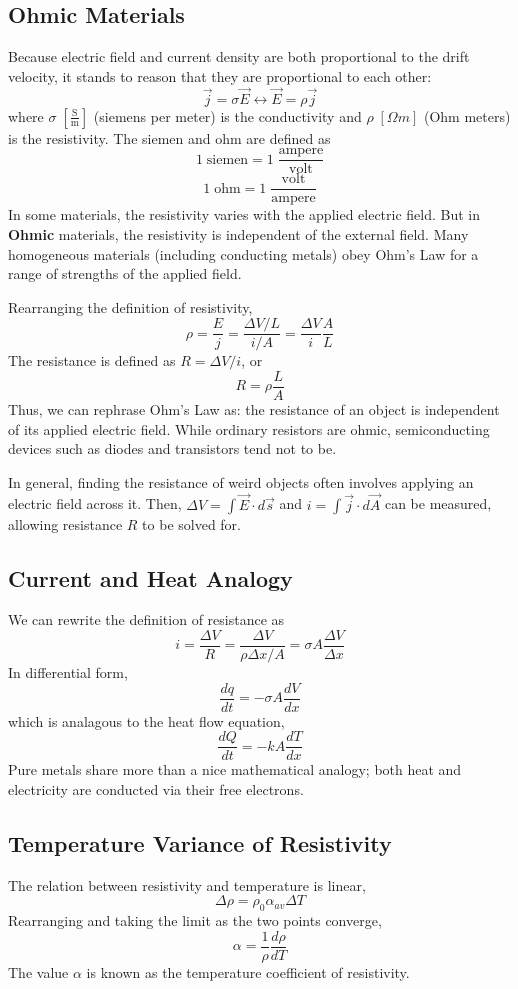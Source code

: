 \documentclass[../PhysicsFormulae.tex]{subfiles}
\begin{document}
\subsection{Ohmic Materials}
Because electric field and current density are both proportional to the drift velocity, it stands to reason that they are proportional to each other:
\[ \vec{j} = \sigma \vec{E} \longleftrightarrow \vec{E} = \rho \vec{j} \]
where $\sigma \; [\mathrm{\frac{S}{m}}]$ (siemens per meter) is the conductivity and $\rho \; [\Omega m]$ (Ohm meters) is the resistivity. The siemen and ohm are defined as
\[ 1 \; \mathrm{siemen} = 1 \; \mathrm{\frac{ampere}{volt}} \]
\[ 1 \; \mathrm{ohm} = 1 \; \mathrm{\frac{volt}{ampere}} \]
In some materials, the resistivity varies with the applied electric field. But in \textbf{Ohmic} materials, the resistivity is independent of the external field. Many homogeneous materials (including conducting metals) obey Ohm's Law for a range of strengths of the applied field. \bigskip

Rearranging the definition of resistivity,
\[ \rho = \frac{E}{j} = \frac{\Delta V/L}{i/A} = \frac{\Delta V}{i} \frac{A}{L} \]
The resistance is defined as $R = \Delta V / i$, or
\[ R = \rho \frac{L}{A} \]
Thus, we can rephrase Ohm's Law as: the resistance of an object is independent of its applied electric field. While ordinary resistors are ohmic, semiconducting devices such as diodes and transistors tend not to be. \bigskip

In general, finding the resistance of weird objects often involves applying an electric field across it. Then, $\Delta V = \int \vec{E} \cdot d\vec{s}$ and $i = \int \vec{j} \cdot d\vec{A}$ can be measured, allowing resistance $R$ to be solved for. 

\subsection{Current and Heat Analogy}
We can rewrite the definition of resistance as
\[ i = \frac{\Delta V}{R} = \frac{\Delta V}{\rho \Delta x/A} = \sigma A \frac{\Delta V}{\Delta x} \]
In differential form, 
\[ \frac{dq}{dt} = -\sigma A\frac{dV}{dx} \]
which is analagous to the heat flow equation, 
\[ \frac{dQ}{dt} = -kA\frac{dT}{dx}\]
Pure metals share more than a nice mathematical analogy; both heat and electricity are conducted via their free electrons. 

\subsection{Temperature Variance of Resistivity}
The relation between resistivity and temperature is linear, 
\[ \Delta \rho = \rho_0 \alpha_{av} \Delta T \]
Rearranging and taking the limit as the two points converge, 
\[ \alpha = \frac{1}{\rho}\frac{d\rho}{dT} \]
The value $\alpha$ is known as the temperature coefficient of resistivity. 
\end{document}

